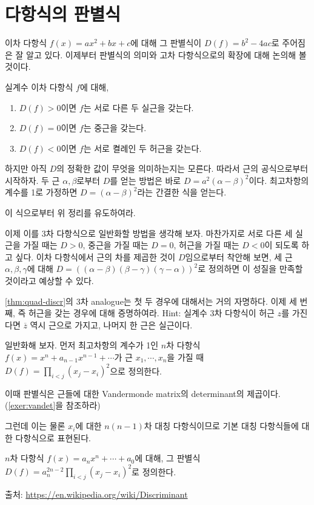 \section{다항식의 판별식}
이차 다항식 $f(x)=ax^2+bx+c$에 대해 그 판별식이 $D(f)=b^2-4ac$로 주어짐은 잘 알고 있다. 이제부터 판별식의 의미와 고차 다항식으로의 확장에 대해 논의해 볼 것이다. \\
\begin{theorem}\label{thm:quad-discr}
    실계수 이차 다항식 $f$에 대해, 
    \begin{enumerate}
        \item $D(f)>0$이면 $f$는 서로 다른 두 실근을 갖는다. 
        \item $D(f)=0$이면 $f$는 중근을 갖는다.
        \item $D(f)<0$이면 $f$는 서로 켤례인 두 허근을 갖는다. 
    \end{enumerate}
\end{theorem}
하지만 아직 $D$의 정확한 값이 무엇을 의미하는지는 모른다. 따라서 근의 공식으로부터 시작하자. 두 근 $\alpha, \beta$로부터 $D$를 얻는 방법은 바로 $D=a^2(\alpha-\beta)^2$이다. 최고차항의 계수를 1로 가정하면 $D=(\alpha-\beta)^2$라는 간결한 식을 얻는다. 
\begin{exercise}
    이 식으로부터 위 정리를 유도하여라. 
\end{exercise}
이제 이를 3차 다항식으로 일반화할 방법을 생각해 보자. 마찬가지로 서로 다른 세 실근을 가질 때는 $D>0$, 중근을 가질 때는 $D=0$, 허근을 가질 때는 $D<0$이 되도록 하고 싶다. 이차 다항식에서 근의 차를 제곱한 것이 $D$임으로부터 착안해 보면, 세 근 $\alpha, \beta, \gamma$에 대해 $D=((\alpha-\beta)(\beta-\gamma)(\gamma-\alpha))^2$로 정의하면 이 성질을 만족할 것이라고 예상할 수 있다. 
\begin{exercise}
    \cref{thm:quad-discr}의 3차 analogue는 첫 두 경우에 대해서는 거의 자명하다. 이제 세 번째, 즉 허근을 갖는 경우에 대해 증명하여라. Hint: 실계수 3차 다항식이 허근 $z$를 가진다면 $\overline{z}$ 역시 근으로 가지고, 나머지 한 근은 실근이다. 
\end{exercise}
일반화해 보자. 먼저 최고차항의 계수가 1인 $n$차 다항식 $f(x)=x^n+a_{n-1}x^{n-1}+\cdots$가 근 $x_1, \cdots, x_n$을 가질 때 $D(f)=\prod_{i<j}(x_j-x_i)^2$으로 정의한다. 
\begin{remark}
    이때 판별식은 근들에 대한 Vandermonde matrix의 determinant의 제곱이다. (\cref{exer:vandet}을 참조하라)
\end{remark}
그런데 이는 물론 $x_i$에 대한 $n(n-1)$차 대칭 다항식이므로 기본 대칭 다항식들에 대한 다항식으로 표현된다. 

\begin{definition}\label{def:discriminant}
$n$차 다항식 $f(x)=a_nx^n+\cdots+a_0$에 대해, 그 판별식 $D(f)=a_n^{2n-2}\prod_{i<j}(x_j-x_i)^2$로 정의한다. 
\end{definition}
출처: \url{https://en.wikipedia.org/wiki/Discriminant}